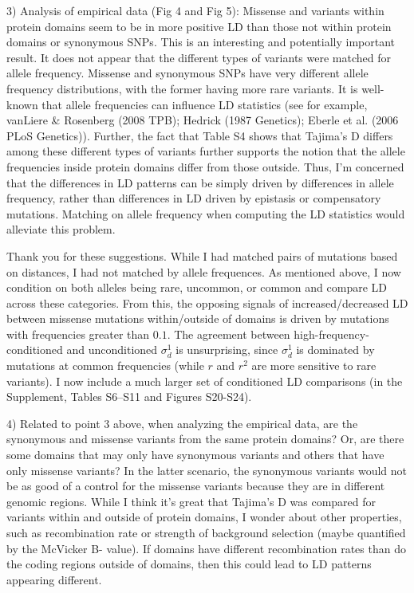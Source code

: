 \documentclass{article}
\newenvironment{response}%
  {\list{}{\leftmargin=0.5in\rightmargin=0.5in\color{blue}}\item[]}%
  {\endlist}
\begin{document}
3) Analysis of empirical data (Fig 4 and Fig 5): Missense and variants within
protein domains seem to be in more positive LD than those not within protein
domains or synonymous SNPs. This is an interesting and potentially important
result. It does not appear that the different types of variants were matched
for allele frequency. Missense and synonymous SNPs have very different allele
frequency distributions, with the former having more rare variants. It is
well-known that allele frequencies can influence LD statistics (see for
example, vanLiere \& Rosenberg (2008 TPB); Hedrick (1987 Genetics); Eberle et
al. (2006 PLoS Genetics)). Further, the fact that Table S4 shows that Tajima's
D differs among these different types of variants further supports the notion
that the allele frequencies inside protein domains differ from those outside.
Thus, I'm concerned that the differences in LD patterns can be simply driven by
differences in allele frequency, rather than differences in LD driven by
epistasis or compensatory mutations. Matching on allele frequency when
computing the LD statistics would alleviate this problem.

\begin{response}
    Thank you for these suggestions. While I had matched pairs of mutations based
    on distances, I had not matched by allele frequences. As mentioned above,
    I now condition on both alleles being rare, uncommon, or common and compare
    LD across these categories.
    From this, the opposing signals of increased/decreased
    LD between missense mutations within/outside of domains is driven by
    mutations with frequencies greater than $0.1$. The agreement between
    high-frequency-conditioned and unconditioned $\sigma_d^1$ is unsurprising,
    since $\sigma_d^1$ is dominated by mutations at common frequencies (while
    $r$ and $r^2$ are more sensitive to rare variants).
    I now include a much larger set of conditioned LD comparisons (in the
    Supplement, Tables S6--S11 and Figures S20-S24).
\end{response}

4) Related to point 3 above, when analyzing the empirical data, are the
synonymous and missense variants from the same protein domains? Or, are there
some domains that may only have synonymous variants and others that have only
missense variants? In the latter scenario, the synonymous variants would not be
as good of a control for the missense variants because they are in different
genomic regions. While I think it's great that Tajima's D was compared for
variants within and outside of protein domains, I wonder about other
properties, such as recombination rate or strength of background selection
(maybe quantified by the McVicker B- value). If domains have different
recombination rates than do the coding regions outside of domains, then this
could lead to LD patterns appearing different.
\end{document}
